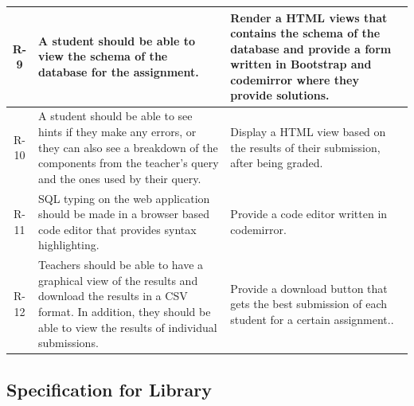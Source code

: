 \begin{tabularx}{\textwidth}{|c|Y|Y|}
  R-9 & A student should be able to view the schema of the database for the assignment. & Render a HTML views that contains the schema of the database and provide a form written in Bootstrap and codemirror where they provide solutions. \\\hline
  R-10 & A  student  should  be  able  to  see  hints  if  they  make  any  errors,  or  they  can  also  see  a breakdown of the components from the teacher’s query and the ones used by their query. & Display a HTML view based on the results of their submission, after being graded. \\\hline
  R-11 & SQL typing on the web application should be made in a browser based code editor that provides syntax highlighting. & Provide a code editor written in codemirror. \\\hline
  R-12 & Teachers should be able to have a graphical view of the results and download the results in  a CSV format.   In  addition,  they  should  be  able  to  view  the  results  of  individual submissions. & Provide a download button that gets the best submission of each student for a certain assignment.. \\\hline
\end{tabularx}

\subsection{Specification for Library}

